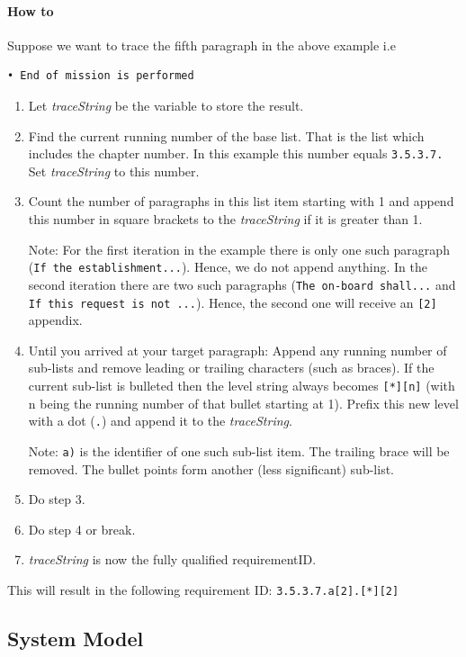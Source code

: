 \documentclass[11pt]{template/openetcs_report}
\begin{document}
\paragraph{How to}

Suppose we want to trace the fifth paragraph in the above example i.e
\begin{verbatim}
• End of mission is performed
\end{verbatim}
\begin{enumerate}
\item Let \textsl{traceString} be the variable to store the result.
\item Find the current running number of the base list. That is the list which
includes the chapter number. In this example this number equals
\verb+3.5.3.7.+ Set \textsl{traceString} to this number.
\item Count the number of paragraphs in this list item starting with 1 and append
this number in square brackets to the \textsl{traceString} if it is greater than 1.

Note: For the first iteration in the example there is only one such paragraph
(\texttt{If the establishment...}). Hence, we do not append anything. In the
second iteration there are two such paragraphs (\texttt{The on-board shall...} and
\texttt{If this request is not ...}). Hence, the second one will receive an
\texttt{[2]} appendix.

\item Until you arrived at your target paragraph: Append any running number of
sub-lists and remove leading or trailing characters (such as braces). If the
current sub-list is bulleted then the level string always becomes
\verb+[*][n]+ (with n being the running number of that bullet starting at
1). Prefix this new level with a dot (\verb+.+) and append it to the
\textsl{traceString}.

Note: \verb+a)+ is the identifier of one such sub-list item. The trailing brace
will be removed. The bullet points form another (less significant) sub-list.
\item Do step 3.
\item Do step 4 or break.
\item \textsl{traceString} is now the fully qualified requirementID.
\end{enumerate}

This will result in the following requirement ID: \quad \verb+3.5.3.7.a[2].[*][2]+



\subsection{System Model}
\label{sec-8}
\end{document}
